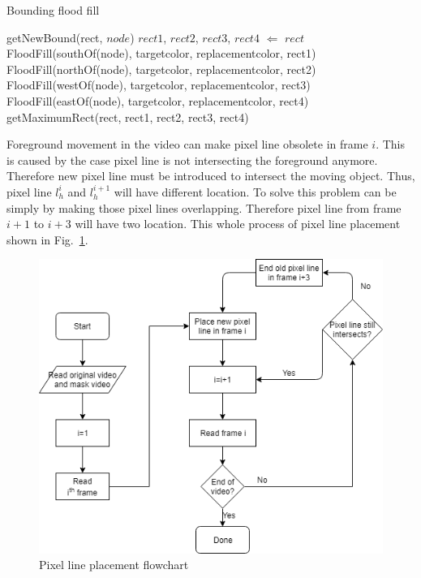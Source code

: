 \documentclass[conference]{IEEEtran}
\begin{document}
\begin{algorithm}
\caption{Bounding flood fill}\label{algfloodfillnew}
\begin{algorithmic}[1]
  \Return
\EndIf
\State getNewBound(rect, $node$)
\State $rect1$, $rect2$, $rect3$, $rect4$ $\Leftarrow$ $rect$
\State FloodFill(southOf(node), targetcolor, replacementcolor, rect1)
\State FloodFill(northOf(node), targetcolor, replacementcolor, rect2)
\State FloodFill(westOf(node), targetcolor, replacementcolor, rect3)
\State FloodFill(eastOf(node), targetcolor, replacementcolor, rect4)
\State getMaximumRect(rect, rect1, rect2, rect3, rect4)
\EndProcedure
\end{algorithmic}
\end{algorithm}

Foreground movement in the video can make pixel line obsolete in frame $i$. This is caused by the case pixel line is not intersecting the foreground anymore. Therefore new pixel line must be introduced to intersect the moving object. Thus, pixel line $l_h^i$ and $l_h^{i+1}$ will have different location. To solve this problem can be simply by making those pixel lines overlapping. Therefore pixel line from frame $i+1$ to $i+3$ will have two location. This whole process of pixel line placement shown in Fig.~\ref{lineflow}.

\begin{figure}[htbp]
\centerline{\includegraphics[width=0.9\linewidth]{lineflow.PNG}}
\caption{Pixel line placement flowchart}
\label{lineflow}
\end{figure}
\end{document}
